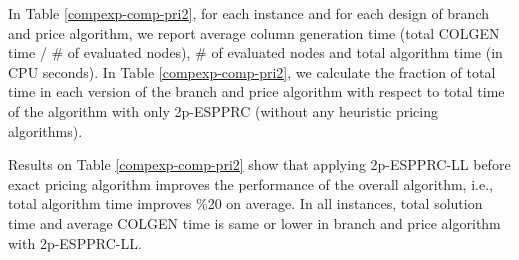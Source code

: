 In Table \ref{compexp-comp-pri2}, for each instance and for each design of branch and
price algorithm, we report average column generation time (total COLGEN time / \# of evaluated
nodes), \# of evaluated nodes and total algorithm time (in CPU seconds). In Table
\ref{compexp-comp-pri2}, we calculate the fraction of total time in each version of
the branch and price algorithm with respect to total time of the algorithm
with only 2p-ESPPRC (without any heuristic pricing algorithms).

Results on Table \ref{compexp-comp-pri2} show that applying 2p-ESPPRC-LL before exact pricing
algorithm improves the performance of the overall algorithm, i.e., total algorithm time improves
\%20 on average. In all instances, total solution time and average COLGEN time is same or
lower in branch and price algorithm with 2p-ESPPRC-LL.

